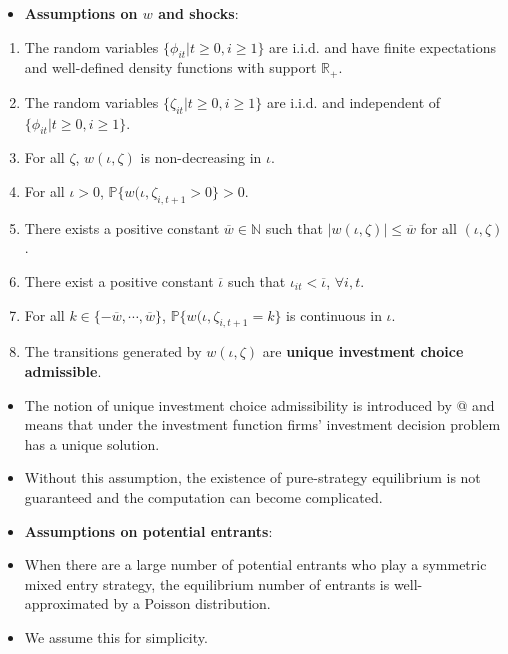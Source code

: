 \documentclass[
]{book}
\providecommand{\tightlist}{%
  \setlength{\itemsep}{0pt}\setlength{\parskip}{0pt}}
\begin{document}
\begin{itemize}
\tightlist
\item
  \textbf{Assumptions on \(w\) and shocks}:
\end{itemize}

\begin{enumerate}
\def\labelenumi{\arabic{enumi}.}
\tightlist
\item
  The random variables \(\{\phi_{it}| t \ge 0, i \ge 1\}\) are i.i.d. and have finite expectations and well-defined density functions with support \(\mathbb{R}_+\).
\item
  The random variables \(\{\zeta_{it}| t \ge 0, i \ge 1\}\) are i.i.d. and independent of \(\{\phi_{it}| t \ge 0, i \ge 1\}\).
\item
  For all \(\zeta\), \(w(\iota, \zeta)\) is non-decreasing in \(\iota\).
\item
  For all \(\iota > 0\), \(\mathbb{P}\{w(\iota, \zeta_{i, t + 1} > 0\} > 0\).
\item
  There exists a positive constant \(\overline{w} \in \mathbb{N}\) such that \(|w(\iota, \zeta)| \le \overline{w}\) for all \((\iota, \zeta)\).
\item
  There exist a positive constant \(\overline{\iota}\) such that \(\iota_{it} < \overline{\iota}\), \(\forall i, t\).
\item
  For all \(k \in \{- \overline{w}, \cdots, \overline{w}\}\), \(\mathbb{P}\{w(\iota, \zeta_{i, t + 1} = k\}\) is continuous in \(\iota\).
\item
  The transitions generated by \(w(\iota, \zeta)\) are \textbf{unique investment choice admissible}.
\end{enumerate}

\begin{itemize}
\tightlist
\item
  The notion of unique investment choice admissibility is introduced by @\citet{doraszelskiComputableMarkovperfectIndustry2010} and means that under the investment function firms' investment decision problem has a unique solution.
\item
  Without this assumption, the existence of pure-strategy equilibrium is not guaranteed and the computation can become complicated.
\item
  \textbf{Assumptions on potential entrants}:
\item
  When there are a large number of potential entrants who play a symmetric mixed entry strategy, the equilibrium number of entrants is well-approximated by a Poisson distribution.
\item
  We assume this for simplicity.
\end{itemize}
\end{document}
